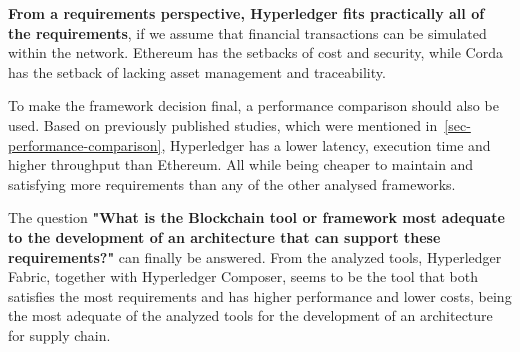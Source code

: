\textbf{From a requirements perspective, Hyperledger fits practically all of the requirements}, if we assume that financial transactions can be simulated within the network. Ethereum has the setbacks of cost and security, while Corda has the setback of lacking asset management and traceability.


To make the framework decision final, a performance comparison should also be used.  Based on previously published studies, which were mentioned in~\ref{sec-performance-comparison}, Hyperledger has a lower latency, execution time and higher throughput than Ethereum. All while being cheaper to maintain and satisfying more requirements than any of the other analysed frameworks.

\par The question \textbf{"What is the Blockchain tool or framework most adequate to the development of an architecture that can support these requirements?"} can finally be answered. From the analyzed tools, Hyperledger Fabric, together with Hyperledger Composer, seems to be the tool that both satisfies the most requirements and has higher performance and lower costs, being the most adequate of the analyzed tools for the development of an architecture for supply chain.





